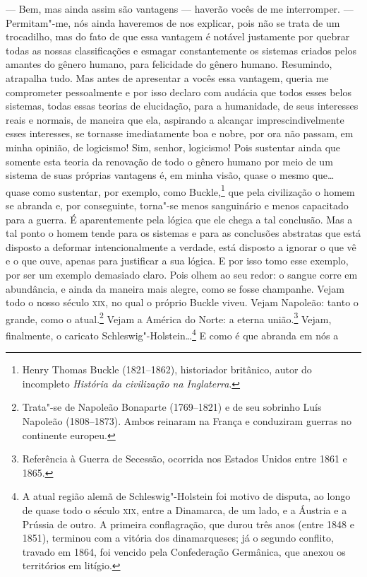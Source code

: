 --- Bem, mas ainda assim são vantagens --- haverão vocês de me interromper.
--- Permitam"-me, nós ainda haveremos de nos explicar, pois não se trata de um
trocadilho, mas do fato de que essa vantagem é notável justamente por quebrar
todas as nossas classificações e esmagar constantemente os sistemas criados
pelos amantes do gênero humano, para felicidade do gênero humano. Resumindo,
atrapalha tudo. Mas antes de apresentar a vocês essa vantagem, queria me
comprometer pessoalmente e por isso declaro com audácia que todos esses belos
sistemas, todas essas teorias de elucidação, para a humanidade, de seus
interesses reais e normais, de maneira que ela, aspirando a alcançar
imprescindivelmente esses interesses, se tornasse imediatamente boa e nobre,
por ora não passam, em minha opinião, de logicismo! Sim, senhor, logicismo! Pois
sustentar ainda que somente esta teoria da renovação de todo o gênero humano
por meio de um sistema de suas próprias vantagens é, em minha visão, quase o
mesmo que\ldots{} quase como sustentar, por exemplo, como Buckle,\footnote{
Henry Thomas Buckle (1821--1862), historiador britânico, autor do incompleto
\textit{História da civilização na Inglaterra}.} que pela civilização o homem
se abranda e, por conseguinte, torna"-se menos sanguinário e menos capacitado
para a guerra. É aparentemente pela lógica que ele chega a tal conclusão. Mas a
tal ponto o homem tende para os sistemas e para as conclusões abstratas que
está disposto a deformar intencionalmente a verdade, está disposto a ignorar o
que vê e o que ouve, apenas para justificar a sua lógica. E por isso tomo esse
exemplo, por ser um exemplo demasiado claro. Pois olhem ao seu redor: o sangue
corre em abundância, e ainda da maneira mais alegre, como se fosse champanhe.
Vejam todo o nosso século \textsc{xix}, no qual o próprio Buckle viveu. Vejam Napoleão:
tanto o grande, como o atual.\footnote{ Trata"-se de Napoleão Bonaparte
(1769--1821) e de seu sobrinho Luís Napoleão (1808--1873). Ambos reinaram na
França e conduziram guerras no continente europeu.} Vejam a América do Norte: a
eterna união.\footnote{ Referência à Guerra de Secessão, ocorrida nos Estados
Unidos entre 1861 e 1865.} Vejam, finalmente, o caricato
Schleswig"-Holstein\ldots{}\footnote{ A atual região alemã de Schleswig"-Holstein
foi motivo de disputa, ao longo de quase todo o século \textsc{xix}, entre a Dinamarca,
de um lado, e a Áustria e a Prússia de outro. A primeira conflagração, que
durou três anos (entre 1848 e 1851), terminou com a vitória dos dinamarqueses;
já o segundo conflito, travado em 1864, foi vencido pela Confederação
Germânica, que anexou os territórios em litígio.} E como é que abranda em nós a
